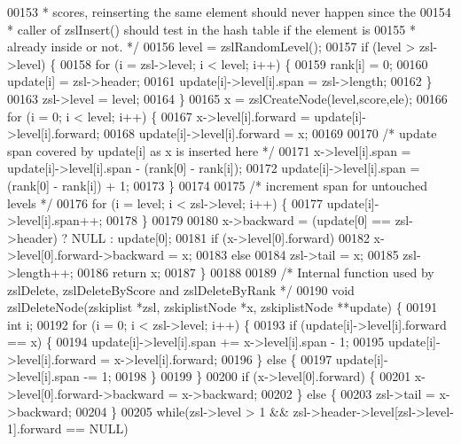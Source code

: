 \begin{DoxyCode}
00153 \textcolor{comment}{     * scores, reinserting the same element should never happen since the}
00154 \textcolor{comment}{     * caller of zslInsert() should test in the hash table if the element is}
00155 \textcolor{comment}{     * already inside or not. */}
00156     level = zslRandomLevel();
00157     \textcolor{keywordflow}{if} (level > zsl->level) \{
00158         \textcolor{keywordflow}{for} (i = zsl->level; i < level; i++) \{
00159             rank[i] = 0;
00160             update[i] = zsl->header;
00161             update[i]->level[i].span = zsl->length;
00162         \}
00163         zsl->level = level;
00164     \}
00165     x = zslCreateNode(level,score,ele);
00166     \textcolor{keywordflow}{for} (i = 0; i < level; i++) \{
00167         x->level[i].forward = update[i]->level[i].forward;
00168         update[i]->level[i].forward = x;
00169 
00170         \textcolor{comment}{/* update span covered by update[i] as x is inserted here */}
00171         x->level[i].span = update[i]->level[i].span - (rank[0] - rank[i]);
00172         update[i]->level[i].span = (rank[0] - rank[i]) + 1;
00173     \}
00174 
00175     \textcolor{comment}{/* increment span for untouched levels */}
00176     \textcolor{keywordflow}{for} (i = level; i < zsl->level; i++) \{
00177         update[i]->level[i].span++;
00178     \}
00179 
00180     x->backward = (update[0] == zsl->header) ? NULL : update[0];
00181     \textcolor{keywordflow}{if} (x->level[0].forward)
00182         x->level[0].forward->backward = x;
00183     \textcolor{keywordflow}{else}
00184         zsl->tail = x;
00185     zsl->length++;
00186     \textcolor{keywordflow}{return} x;
00187 \}
00188 
00189 \textcolor{comment}{/* Internal function used by zslDelete, zslDeleteByScore and zslDeleteByRank */}
00190 \textcolor{keywordtype}{void} zslDeleteNode(zskiplist *zsl, zskiplistNode *x, zskiplistNode **update) \{
00191     \textcolor{keywordtype}{int} i;
00192     \textcolor{keywordflow}{for} (i = 0; i < zsl->level; i++) \{
00193         \textcolor{keywordflow}{if} (update[i]->level[i].forward == x) \{
00194             update[i]->level[i].span += x->level[i].span - 1;
00195             update[i]->level[i].forward = x->level[i].forward;
00196         \} \textcolor{keywordflow}{else} \{
00197             update[i]->level[i].span -= 1;
00198         \}
00199     \}
00200     \textcolor{keywordflow}{if} (x->level[0].forward) \{
00201         x->level[0].forward->backward = x->backward;
00202     \} \textcolor{keywordflow}{else} \{
00203         zsl->tail = x->backward;
00204     \}
00205     \textcolor{keywordflow}{while}(zsl->level > 1 && zsl->header->level[zsl->level-1].forward == NULL)

\end{DoxyCode}
